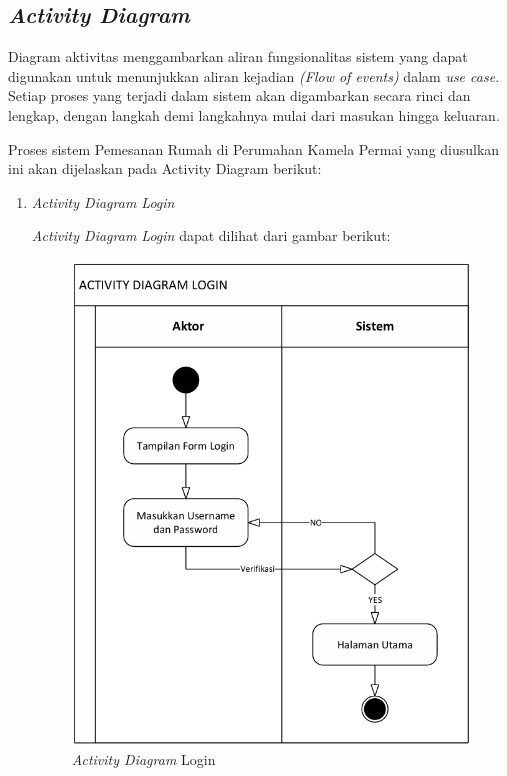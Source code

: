 \subsection{\textit{Activity Diagram}}
\par Diagram aktivitas menggambarkan aliran fungsionalitas sistem yang dapat digunakan untuk menunjukkan aliran kejadian \textit{(Flow of events)} dalam \textit{use case}. Setiap proses yang terjadi dalam sistem akan digambarkan secara rinci dan lengkap, dengan langkah demi langkahnya mulai dari masukan hingga keluaran.
\par Proses sistem Pemesanan Rumah di Perumahan Kamela Permai yang diusulkan ini akan dijelaskan pada Activity Diagram berikut:

\begin{enumerate}
    \item \textit{Activity Diagram Login}
        \par \textit{Activity Diagram Login } dapat dilihat dari gambar berikut:
            \begin{figure}
                \centering
                \includegraphics[width=0.95\linewidth]{uml/Activity Diagram - Login.png}
                \caption{\textit{Activity Diagram} Login}
                \label{fig:enter-label}
            \end{figure}
            

\end{enumerate}
